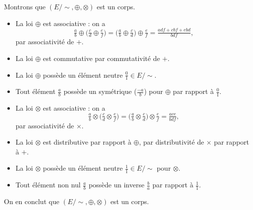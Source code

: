 \documentclass[./main]{subfiles}
\begin{document}
\begin{enumerate}
      Montrons que $(E/{\sim}, \oplus, \otimes)$ est un corps.
      \begin{itemize}
        \item La loi $\oplus$ est associative : on a \[
            \tfrac{a}{b} \oplus \big( \tfrac{c}{d} \oplus \tfrac{e}{f} \big)  =
            \big(\tfrac{a}{b} \oplus  \tfrac{c}{d}\big) \oplus \tfrac{e}{f} = \tfrac{adf + cbf + ebd}{bdf}
          ,\] par associativité de $+$.
        \item La loi $\oplus$ est commutative par commutativité de $+$.
        \item La loi $\oplus$ possède un élément neutre $\tfrac{0}{1} \in E/{\sim}$.
        \item Tout élément $\tfrac{a}{b}$ possède un symétrique ($\tfrac{-a}{b}$) pour $\oplus$ par rapport à $\tfrac{0}{1}$.
        \item La loi $\otimes$ est associative : on a \[
            \tfrac{a}{b} \otimes \big( \tfrac{c}{d} \otimes \tfrac{e}{f} \big)  =
            \big( \tfrac{a}{b} \otimes \tfrac{c}{d} \big)  \otimes \tfrac{e}{f} =
            \tfrac{a c e}{b d f}
          ,\] par associativité de $\times$.
        \item La loi $\otimes$ est distributive par rapport à $\oplus$, par distributivité de $\times$ par rapport à $+$.
        \item La loi $\otimes$ possède un élément neutre $\tfrac{1}{1} \in E/{\sim}$ pour $\otimes$.
        \item Tout élément non nul $\tfrac{a}{b}$ possède un inverse $\tfrac{b}{a}$ par rapport à $\tfrac{1}{1}$. 
      \end{itemize}
      On en conclut que $(E/{\sim}, \oplus, \otimes)$ est un corps.


\end{enumerate}
\end{document}
